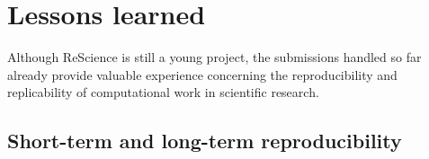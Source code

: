 \documentclass[a4paper,10pt, twocolumn]{article}
\begin{document}



\section*{Lessons learned}

Although ReScience is still a young project, the submissions handled
so far already provide valuable experience concerning the
reproducibility and replicability of computational work in scientific
research.

\subsection*{Short-term and long-term reproducibility}
\end{document}
